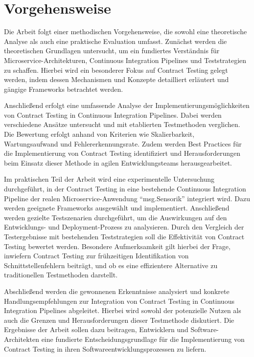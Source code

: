 \chapter{Vorgehensweise}\label{ch:foundation}

Die Arbeit folgt einer methodischen Vorgehensweise, die sowohl eine theoretische Analyse als auch eine praktische Evaluation umfasst.
Zunächst werden die theoretischen Grundlagen untersucht, um ein fundiertes Verständnis für Microservice-Architekturen, Continuous Integration Pipelines und Teststrategien zu schaffen.
Hierbei wird ein besonderer Fokus auf Contract Testing gelegt werden, indem dessen Mechanismen und Konzepte detailliert erläutert und gängige Frameworks betrachtet werden.

Anschließend erfolgt eine umfassende Analyse der Implementierungsmöglichkeiten von Contract Testing in Continuous Integration Pipelines.
Dabei werden verschiedene Ansätze untersucht und mit etablierten Testmethoden verglichen.
Die Bewertung erfolgt anhand von Kriterien wie Skalierbarkeit, Wartungsaufwand und Fehlererkennungsrate.
Zudem werden Best Practices für die Implementierung von Contract Testing identifiziert und Herausforderungen beim Einsatz dieser Methode in agilen Entwicklungsteams herausgearbeitet.

Im praktischen Teil der Arbeit wird eine experimentelle Untersuchung durchgeführt, in der Contract Testing in eine
bestehende Continuous Integration Pipeline der realen Microservice-Anwendung \enquote{msg.Sensorik} integriert
wird.
Dazu werden geeignete Frameworks ausgewählt und implementiert.
Anschließend werden gezielte Testszenarien durchgeführt, um die Auswirkungen auf den Entwicklungs- und Deployment-Prozess zu analysieren.
Durch den Vergleich der Testergebnisse mit bestehenden Teststrategien soll die Effektivität von Contract Testing bewertet werden.
Besondere Aufmerksamkeit gilt hierbei der Frage, inwiefern Contract Testing zur frühzeitigen Identifikation von Schnittstellenfehlern beiträgt, und ob es eine effizientere Alternative zu traditionellen Testmethoden darstellt.

Abschließend werden die gewonnenen Erkenntnisse analysiert und konkrete Handlungsempfehlungen zur Integration von Contract Testing in Continuous Integration Pipelines abgeleitet.
Hierbei wird sowohl der potenzielle Nutzen als auch die Grenzen und Herausforderungen dieser Testmethode diskutiert.
Die Ergebnisse der Arbeit sollen dazu beitragen, Entwicklern und Software-Architekten eine fundierte Entscheidungsgrundlage für die Implementierung von Contract Testing in ihren Softwareentwicklungsprozessen zu liefern.
